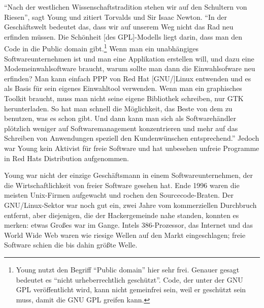 "`Nach der westlichen Wissenschaftstradition stehen wir auf den Schultern von Riesen"', sagt Young und zitiert Torvalds und Sir Isaac Newton. "`In der Geschäftswelt bedeutet das, dass wir auf unserem Weg nicht das Rad neu erfinden müssen. Die Schönheit [des GPL]-Modells liegt darin, dass man den Code in die Public domain gibt.\footnote{Young nutzt den Begriff "`Public domain"' hier sehr frei. Genauer gesagt bedeutet es "`nicht urheberrechtlich geschützt"'. Code, der unter der GNU GPL veröffentlicht wird, kann nicht gemeinfrei sein, weil er geschützt sein muss, damit die GNU GPL greifen kann.} Wenn man ein unabhängiges Softwareunternehmen ist und man eine Applikation erstellen will, und dazu eine Modemeinwahlsoftware braucht, warum sollte man dann die Einwahlsofware neu erfinden? Man kann einfach PPP von Red Hat [GNU/]Linux entwenden und es als Basis für sein eigenes Einwahltool verwenden. Wenn man ein graphisches Toolkit braucht, muss man nicht seine eigene Bibliothek schreiben, nur GTK herunterladen. So hat man schnell die Möglichkeit, das Beste von dem zu benutzen, was es schon gibt. Und dann kann man sich als Softwarehändler plötzlich weniger auf Softwaremanagement konzentrieren und mehr auf das Schreiben von Anwendungen speziell den Kundenwünschen entsprechend."' Jedoch war Young kein Aktivist für freie Software und hat unbesehen unfreie Programme in Red Hats Distribution aufgenommen.

Young war nicht der einzige Geschäftsmann in einem Softwareunternehmen, der die Wirtschaftlichkeit von freier Software gesehen hat. Ende 1996 waren die meisten Unix-Firmen aufgewacht und rochen den Sourcecode-Braten. Der GNU/Linux-Sektor war noch gut ein, zwei Jahre vom kommerziellen Durchbruch entfernt, aber diejenigen, die der Hackergemeinde nahe standen, konnten es merken: etwas Großes war im Gange. Intels 386-Prozessor, das Internet und das World Wide Web waren wie riesige Wellen auf den Markt eingeschlagen; freie Software schien die bis dahin größte Welle.

